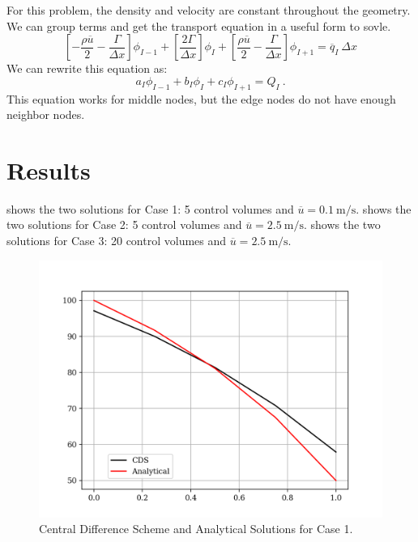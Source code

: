 \documentclass[12pt]{article}
\begin{document}
For this problem, the density and velocity are constant throughout the geometry. We can group terms and get the transport equation in a useful form to sovle.
\begin{equation}
    \left[ -\frac{\rho \overline{u}}{2} - \frac{\Gamma}{\Delta x} \right] \phi_{I-1} + \left[ \frac{2\Gamma}{\Delta x} \right] \phi_{I} + \left[ \frac{\rho \overline{u}}{2} - \frac{\Gamma}{\Delta x} \right] \phi_{I+1} = \overline{q}_{I}\: \Delta x
    \label{eq:grouped}
\end{equation}
We can rewrite this equation as:
\begin{equation}
    a_{I}\phi_{I-1} + b_{I}\phi_{I} + c_{I}\phi_{I+1} = Q_{I}\:.
    \label{eq:coef}
\end{equation}
This equation works for middle nodes, but the edge nodes do not have enough neighbor nodes. 



\section{Results}
     shows the two solutions for Case 1: 5 control volumes and $\overline{u}=\SI{0.1}{\meter\per\second}$.
     shows the two solutions for Case 2: 5 control volumes and $\overline{u}=\SI{2.5}{\meter\per\second}$.
     shows the two solutions for Case 3: 20 control volumes and $\overline{u}=\SI{2.5}{\meter\per\second}$.
    \begin{figure}[htbp]
        \centering
        \includegraphics[width=\textwidth]{plots/graph_case1.png}
        \caption{Central Difference Scheme and Analytical Solutions for Case 1.}
        \label{fig:case1}
    \end{figure}
\end{document}
